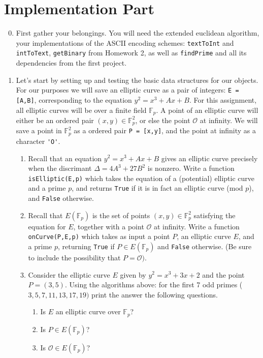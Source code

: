 \documentclass[11pt]{article}
\newcommand{\bF}{\mathbb{F}}
\newcommand{\cO}{\mathcal{O}}
\begin{document}
\section*{Implementation Part}
\begin{enumerate}
  \setcounter{enumi}{-1}
  \item{
  First gather your belongings.  You will need the extended euclidean algorithm, your implementations of the ASCII encoding schemes: \verb|textToInt| and \verb|intToText|, \verb|getBinary| from Homework 2, as well as \verb|findPrime| and all its dependencies from the first project.
  }
  \item{
  Let's start by setting up and testing the basic data structures for our objects.  For our purposes we will save an elliptic curve as a pair of integers: \verb|E = [A,B]|, corresponding to the equation $y^2 = x^3 + Ax + B$.  For this assignment, all elliptic curves will be over a finite field $\bF_p$.  A point of an elliptic curve will either be an ordered pair $(x,y)\in\bF_p^2$, or else the point $\cO$ at infinity.  We will save a point in $\bF_p^2$ as a ordered pair \verb|P = [x,y]|, and the point at infinity as a character \verb|'O'|.
  \begin{enumerate}
    \item{
    Recall that an equation $y^2 = x^3 + Ax + B$ gives an elliptic curve precisely when the discrimant $\Delta = 4A^3 + 27B^2$ is nonzero.  Write a function \verb|isElliptic(E,p)| which takes the equation of a (potential) elliptic curve and a prime $p$, and returns \verb|True| if it is in fact an elliptic curve (mod $p$), and \verb|False| otherwise.
    }
    \item{
    Recall that $E(\bF_p)$ is the set of points $(x,y)\in\bF_p^2$ satisfying the equation for $E$, together with a point $\cO$ at infinity.   Write a function \verb|onCurve(P,E,p)| which takes as input a point $P$, an elliptic curve $E$, and a prime $p$, returning \verb|True| if $P\in E(\bF_p)$ and \verb|False| otherwise.  (Be sure to include the possibility that $P=\cO)$.
    }
    \item{
    Consider the elliptic curve $E$ given by $y^2 = x^3 + 3x + 2$ and the point $P=(3,5)$.  Using the algorithms above: for the first 7 odd primes ($3,5,7,11,13,17,19)$ print the answer the following questions.
    \begin{enumerate}
      \item{Is $E$ an elliptic curve over $\bF_p$?}
      \item{Is $P\in E(\bF_p)$?}
      \item{Is $\cO\in E(\bF_p)$?}

\end{enumerate}}
\end{enumerate}}
\end{enumerate}
\end{document}
